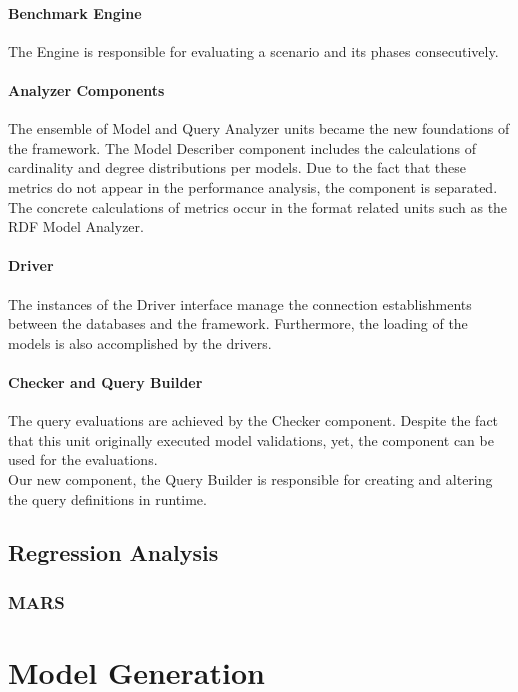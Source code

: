 \paragraph{Benchmark Engine}
The \textsf{Engine} is responsible for evaluating a scenario and its phases consecutively.

\paragraph{Analyzer Components}

The ensemble of \textsf{Model} and \textsf{Query Analyzer} units became the new foundations of the framework. The \textsf{Model Describer} component includes the calculations of cardinality and degree distributions per models. Due to the fact that these metrics do not appear in the performance analysis, the component is separated.\\
The concrete calculations of metrics occur in the format related units such as the \textsf{RDF Model Analyzer}.

\paragraph{Driver}
The instances of the \textsf{Driver} interface manage the connection establishments between the databases and the framework. Furthermore, the loading of the models is also accomplished by the drivers.

\paragraph{Checker and Query Builder}

The query evaluations are achieved by the \textsf{Checker} component. Despite the fact that this unit originally executed model validations, yet, the component can be used for the evaluations.\\
Our new component, the \textsf{Query Builder} is responsible for creating and altering the query definitions in runtime.

\subsection{Regression Analysis}

\subsubsection{MARS}


\section{Model Generation}

